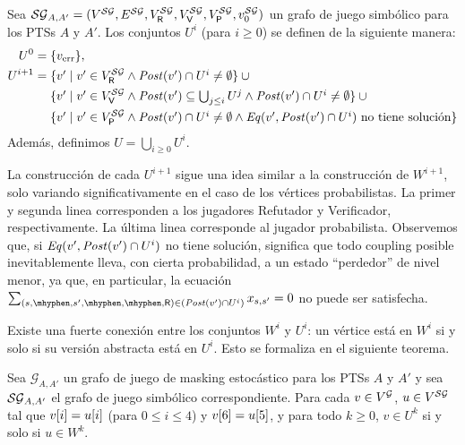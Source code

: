 \begin{definition}\label{def:U_prob}
  Sea
  $\SymbG_{A,A'} = ( V^{\SymbG},  E^{\SymbG}, V^{\SymbG}_\Refuter, V^{\SymbG}_\Verifier, V^{\SymbG}_\Probabilistic, v_0^{\SymbG} )$
  un grafo de juego simbólico para los PTSs $A$ y $A'$.
  Los conjuntos $U^i$ (para $i \geq 0$) se definen de la siguiente manera:
  {\footnotesize%
  \begin{align*}
    U^0 = {} & \{\ErrorSt\},  \label{def:U_probji}\\
    U^{i+1} = {}
    & \textstyle 
    \{v' \mid v' \in V^\SymbG_\Refuter \wedge \post(v') \cap U^{i} \neq \emptyset \} \cup {}\\
    & \textstyle 
    \{v' \mid v' \in V^\SymbG_\Verifier \wedge \post(v') \subseteq \bigcup_{j\leq i}U^{j} \wedge \post(v') \cap U^i \neq \emptyset  \}  \cup {}\\
    & \textstyle 
    \{v' \mid v' \in V^\SymbG_\Probabilistic \wedge \post(v') \cap U^{i} \neq \emptyset \wedge \Eq(v', \post(v') \cap U^{i}) \text{ no tiene solución}\}
  \end{align*}
  }%
  Además, definimos $U = \bigcup_{i \geq 0} U^i$.
\end{definition}
%

La construcción de cada $U^{i+1}$ sigue una idea similar a la construcción de $W^{i+1}$, solo variando significativamente en el caso de los vértices probabilistas.  La primer y segunda linea corresponden a los jugadores Refutador y Verificador, respectivamente. La última linea corresponde al jugador probabilista.
%
Observemos que, si $\Eq(v', \post(v') \cap U^{i})$ no tiene solución, significa que todo coupling posible inevitablemente lleva, con cierta probabilidad, a un estado ``perdedor'' de nivel menor, ya que, en
particular, la ecuación
$\sum_{(s, \mhyphen, s', \mhyphen, \mhyphen, \Refuter) \in (\post(v') {\cap} U^{i})} x_{s,s'} = 0$
no puede ser satisfecha.

Existe una fuerte conexión entre los conjuntos  $W^i$ y $U^i$: un vértice está en $W^i$ si y solo si su versión abstracta está en $U^i$.  Esto se formaliza en el siguiente teorema.
	
\begin{theorem}\label{th:U-and-W}
  Sea $\mathcal{G}_{A,A'}$ un grafo de juego de masking estocástico
  para los PTSs $A$ y $A'$ y sea $\SymbG_{A,A'}$
  el grafo de juego simbólico correspondiente.
%
  Para cada $v \in V^\StochG$, $u \in V^\SymbG$ tal que 
  $\pr{i}{v} = \pr{i}{u}$ (para $0 \leq i \leq 4$) y
  $\pr{6}{v} = \pr{5}{u}$, y para todo $k\geq 0$,
  $v \in U^k$ si y solo si $u \in W^k$.
\end{theorem}

